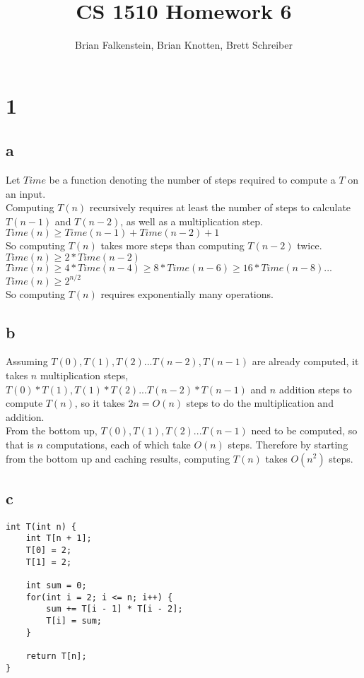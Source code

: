 \documentclass[letterpaper,notitlepage,twoside]{article}
\title{CS 1510 Homework 6}
\author{Brian Falkenstein, Brian Knotten, Brett Schreiber}
\begin{document}
\maketitle

\section*{1}
\subsection*{a}
Let $Time$ be a function denoting the number of steps required to compute a $T$ on an input. \\
Computing $T(n)$ recursively requires at least the number of steps to calculate $T(n - 1)$ and $T(n - 2)$, as well as a multiplication step. \\
$Time(n) \geq Time(n - 1) + Time(n - 2) + 1$ \\
So computing $T(n)$ takes more steps than computing $T(n - 2)$ twice. \\
$Time(n) \geq 2 * Time(n - 2)$ \\
$Time(n) \geq 4 * Time(n - 4) \geq 8 * Time(n - 6) \geq 16 * Time(n - 8) ...$ \\
$Time(n) \geq 2^{n/2}$ \\
So computing $T(n)$ requires exponentially many operations.

\subsection*{b}
Assuming $T(0), T(1), T(2)...T(n -2), T(n - 1)$ are already computed, it takes $n$ multiplication steps, $T(0) * T(1), T(1) * T(2)...T(n - 2) * T(n - 1)$ and $n$ addition steps to compute $T(n)$, so it takes $2n = O(n)$ steps to do the multiplication and addition. \\
From the bottom up, $T(0), T(1), T(2)...T(n - 1)$ need to be computed, so that is $n$ computations, each of which take $O(n)$ steps. Therefore by starting from the bottom up and caching results, computing $T(n)$ takes $O(n^2)$ steps.

\subsection*{c}
\begin{verbatim}
int T(int n) {
    int T[n + 1];
    T[0] = 2;
    T[1] = 2;
    
    int sum = 0;
    for(int i = 2; i <= n; i++) {
        sum += T[i - 1] * T[i - 2];
        T[i] = sum;
    }
    
    return T[n];
}
\end{verbatim}
\end{document}
